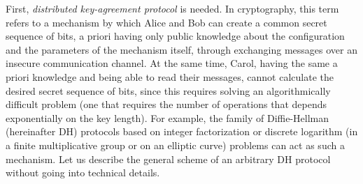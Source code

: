 First, \emph{distributed key-agreement protocol} \cite{Boyd} is needed. In cryptography, this term refers to a mechanism by which Alice and Bob can create a common secret sequence of bits, a priori having only public knowledge about the configuration and the parameters of the mechanism itself, through exchanging messages over an insecure communication channel. At the same time, Carol, having the same a priori knowledge and being able to read their messages, cannot calculate the desired secret sequence of bits, since this requires solving an algorithmically difficult problem (one that requires the number of operations that depends exponentially on the key length). For example, the family of Diffie-Hellman (hereinafter DH) protocols based on integer factorization or discrete logarithm (in a finite multiplicative group or on an elliptic curve) problems can act as such a mechanism. Let us describe the general scheme of an arbitrary DH protocol without going into technical details. %

